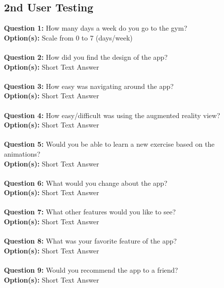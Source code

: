 \documentclass{l4proj}
\begin{document}
\begin{appendices}
\chapter{2nd User Testing}
\label{survey2}
\textbf{Question 1:} How many days a week do you go to the gym? \\
\textbf{Option(s):} Scale from 0 to 7 (days/week)
\\
\\
\textbf{Question 2:} How did you find the design of the app? \\
\textbf{Option(s):} Short Text Answer
\\
\\
\textbf{Question 3:} How easy was navigating around the app? \\
\textbf{Option(s):} Short Text Answer
\\
\\
\textbf{Question 4:} How easy/difficult was using the augmented reality view? \\
\textbf{Option(s):} Short Text Answer
\\
\\
\textbf{Question 5:} Would you be able to learn a new exercise based on the animations? \\
\textbf{Option(s):} Short Text Answer
\\
\\
\textbf{Question 6:} What would you change about the app? \\
\textbf{Option(s):} Short Text Answer
\\
\\
\textbf{Question 7:} What other features would you like to see? \\
\textbf{Option(s):} Short Text Answer
\\
\\
\textbf{Question 8:} What was your favorite feature of the app? \\
\textbf{Option(s):} Short Text Answer
\\
\\
\textbf{Question 9:} Would you recommend the app to a friend? \\
\textbf{Option(s):} Short Text Answer    

\end{appendices}




\end{document}

